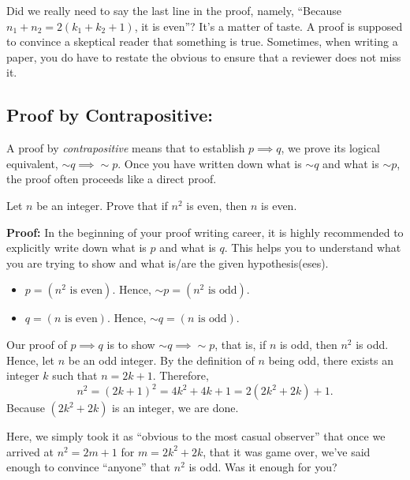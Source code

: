 \vspace*{.2cm}

Did we really need to say the last line in the proof, namely, ``Because $n_1+n_2=2(k_1+k_2+1)$, it is even''? It's a matter of taste. A proof is supposed to convince a skeptical reader that something is true. Sometimes, when writing a paper, you do have to restate the obvious to ensure that a reviewer does not miss it. 



\subsection{Proof by Contrapositive:} A proof by \emph{contrapositive} means that to establish $p \implies q$, we prove its logical equivalent, $\sim q \implies \sim p$. Once you have written down what is $\sim q$ and what is $\sim p$, the proof often proceeds like a direct proof. 

\vspace*{.2cm}
\begin{example} 
\label{ex:nSquaredEven}
Let $n$ be an integer. Prove that if $n^2$ is even, then $n$ is even.
\end{example}

\textbf{Proof:} In the beginning of your proof writing career, it is highly recommended to explicitly write down what is $p$ and what is $q$. This helps you to understand what you are trying to show and what is/are the given hypothesis(eses).\\

\begin{itemize}
    \item $p = (n^2 \text{ is even})$. Hence, $\sim p = (n^2 \text{ is odd})$.
   \item $q = (n \text{ is even})$. Hence, $\sim q = (n \text{ is odd})$.
\end{itemize}
    Our proof of $p \implies q$ is to show $\sim q \implies \sim p$, that is, if $n$ is odd, then $n^2$ is odd.  Hence, let $n$ be an odd integer. By the definition of $n$ being odd, there exists an integer $k$ such that $ n = 2k+1$. Therefore,
 $$n^2 = (2k+1)^2 = 4k^2 + 4k + 1 = 2(2k^2+2k)+1.$$
    Because $(2k^2+2k)$ is an integer, we are done. 
\Qed

\vspace*{.2cm}

Here, we simply took it as ``obvious to the most casual observer'' that once we arrived at $n^2 = 2m+1$ for $m=2k^2+2k$, that it was game over, we've said enough to convince ``anyone'' that $n^2$ is odd. Was it enough for you? 


